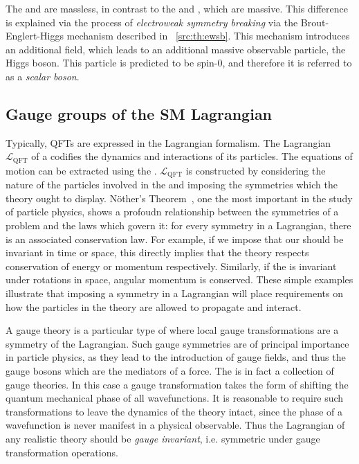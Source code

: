 The \Pphoton and \Pgluon are massless, in contrast to the \PWmp and \PZzero, which are massive. This difference is explained via the process of \emph{electroweak symmetry breaking} via the Brout-Englert-Higgs mechanism described in \Sec~\ref{src:th:ewsb}. This mechanism introduces an additional field, which leads to an additional massive observable particle, the Higgs boson. This particle is predicted to be spin-$0$, and therefore it is referred to as a \emph{scalar boson}.

\subsection{Gauge groups of the SM Lagrangian}
\label{sec:th:gauge}

Typically, QFTs are expressed in the Lagrangian formalism. The Lagrangian $\mathcal{L}_{\text{QFT}}$ of a \QFT codifies the dynamics and interactions of its particles. The equations of motion can be extracted using the \ELE. $\mathcal{L}_{\text{QFT}}$ is constructed by considering the nature of the particles involved in the \QFT and imposing the symmetries which the theory ought to display. N\"other's Theorem~\cite{Noether}, one the most important in the study of particle physics, shows a profoudn relationship between the symmetries of a problem and the laws which govern it: for every symmetry in a Lagrangian, there is an associated conservation law. For example, if we impose that our \QFT should be invariant in time or space, this directly implies that the theory respects conservation of energy or momentum respectively. Similarly, if the \QFT is invariant under rotations in space, angular momentum is conserved. These simple examples illustrate that imposing a symmetry in a Lagrangian will place requirements on how the particles in the theory are allowed to propagate and interact. 

A gauge theory is a particular type of \QFT where local gauge transformations are a symmetry of the Lagrangian. Such gauge symmetries are of principal importance in particle physics, as they lead to the introduction of gauge fields, and thus the gauge bosons which are the mediators of a force. The \SM is in fact a collection of gauge theories. In this case a gauge transformation takes the form of shifting the quantum mechanical phase of all wavefunctions. It is reasonable to require such transformations to leave the dynamics of the theory intact, since the phase of a wavefunction is never manifest in a physical observable. Thus the Lagrangian of any realistic theory should be \emph{gauge invariant}, i.e. symmetric under gauge transformation operations.  

